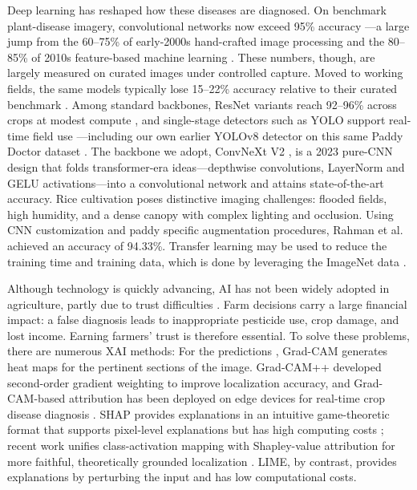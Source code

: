 \documentclass[pdflatex,sn-mathphys-num]{sn-jnl}%
\begin{document}
Deep learning has reshaped how these diseases are diagnosed. On benchmark plant-disease imagery, convolutional networks now exceed 95\% accuracy \cite{mohanty2016using}---a large jump from the 60--75\% of early-2000s hand-crafted image processing and the 80--85\% of 2010s feature-based machine learning \cite{liakos2018machine,shafay2025review,akter2024riceleafcnn}. These numbers, though, are largely measured on curated images under controlled capture. Moved to working fields, the same models typically lose 15--22\% accuracy relative to their curated benchmark \cite{mrisho2020accuracy}. Among standard backbones, ResNet variants reach 92--96\% across crops at modest compute \cite{he2016deep,ferentinos2018deep}, and single-stage detectors such as YOLO support real-time field use \cite{fuentes2017robust}---including our own earlier YOLOv8 detector on this same Paddy Doctor dataset \cite{kumar2026yolo}. The backbone we adopt, ConvNeXt V2 \cite{woo2023convnext,wang2024wheatconvnext}, is a 2023 pure-CNN design that folds transformer-era ideas---depthwise convolutions, LayerNorm and GELU activations---into a convolutional network and attains state-of-the-art accuracy. 
Rice cultivation poses distinctive imaging challenges: flooded fields, high humidity, and a dense canopy with complex lighting and occlusion. Using CNN customization and paddy specific augmentation procedures, Rahman et al. \cite{rahman2020deep} achieved an accuracy of 94.33\%. Transfer learning may be used to reduce the training time and training data, which is done by leveraging the ImageNet data \cite{lu2017identification}.



Although technology is quickly advancing, AI has not been widely adopted in agriculture, partly due to trust difficulties \cite{wolfert2017big,ahmad2024nextgen,gardezi2024aitrust}. Farm decisions carry a large financial impact: a false diagnosis leads to inappropriate pesticide use, crop damage, and lost income. Earning farmers' trust is therefore essential. To solve these problems, there are numerous XAI methods: For the predictions \cite{selvaraju2017grad}, Grad-CAM generates heat maps for the pertinent sections of the image. Grad-CAM++ \cite{chattopadhay2018grad,khan2024potato} developed second-order gradient weighting to improve localization accuracy, and Grad-CAM-based attribution has been deployed on edge devices for real-time crop disease diagnosis \cite{karim2024grapegradcam}. SHAP provides explanations in an intuitive game-theoretic format that supports pixel-level explanations but has high computing costs \cite{lundberg2017unified}; recent work unifies class-activation mapping with Shapley-value attribution for more faithful, theoretically grounded localization \cite{cai2025shapleycam}. LIME, by contrast, provides explanations by perturbing the input \cite{ribeiro2016should} and has low computational costs.
\end{document}
